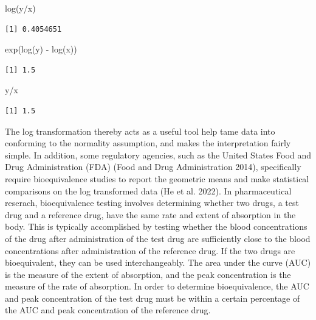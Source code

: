 \documentclass[
]{interact}
\newenvironment{Shaded}{\begin{snugshade}}{\end{snugshade}}
\newcommand{\FunctionTok}[1]{\textcolor[rgb]{0.28,0.35,0.67}{#1}}
\newcommand{\NormalTok}[1]{\textcolor[rgb]{0.00,0.23,0.31}{#1}}
\newcommand{\SpecialCharTok}[1]{\textcolor[rgb]{0.37,0.37,0.37}{#1}}
\begin{document}
\begin{Shaded}
\begin{Highlighting}[]
\FunctionTok{log}\NormalTok{(y}\SpecialCharTok{/}\NormalTok{x)}
\end{Highlighting}
\end{Shaded}

\begin{verbatim}
[1] 0.4054651
\end{verbatim}

\begin{Shaded}
\begin{Highlighting}[]
\FunctionTok{exp}\NormalTok{(}\FunctionTok{log}\NormalTok{(y) }\SpecialCharTok{{-}} \FunctionTok{log}\NormalTok{(x))}
\end{Highlighting}
\end{Shaded}

\begin{verbatim}
[1] 1.5
\end{verbatim}

\begin{Shaded}
\begin{Highlighting}[]
\NormalTok{y}\SpecialCharTok{/}\NormalTok{x}
\end{Highlighting}
\end{Shaded}

\begin{verbatim}
[1] 1.5
\end{verbatim}

The log transformation thereby acts as a useful tool help tame data into
conforming to the normality assumption, and makes the interpretation
fairly simple. In addition, some regulatory agencies, such as the United
States Food and Drug Administration (FDA) (Food and Drug Administration
2014), specifically require bioequivalence studies to report the
geometric means and make statistical comparisons on the log transformed
data (He et al. 2022). In pharmaceutical reserach, bioequivalence
testing involves determining whether two drugs, a test drug and a
reference drug, have the same rate and extent of absorption in the body.
This is typically accomplished by testing whether the blood
concentrations of the drug after administration of the test drug are
sufficiently close to the blood concentrations after administration of
the reference drug. If the two drugs are bioequivalent, they can be used
interchangeably. The area under the curve (AUC) is the measure of the
extent of absorption, and the peak concentration is the measure of the
rate of absorption. In order to determine bioequivalence, the AUC and
peak concentration of the test drug must be within a certain percentage
of the AUC and peak concentration of the reference drug.
\end{document}
